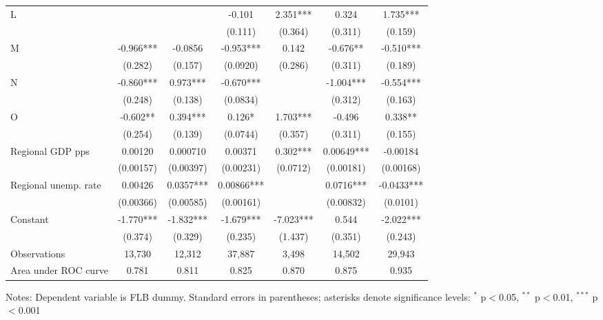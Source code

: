 \begin{threeparttable}
\begin{tabular}{l*{6}{S}}
\quad L                   &            &           & -0.101     & 2.351***  & 0.324      & 1.735***   \\
                          &            &           & (0.111)    & (0.364)   & (0.311)    & (0.159)    \\[0.5ex]

\quad M                   &  -0.966*** & -0.0856   & -0.953***  & 0.142     & -0.676**   & -0.510***  \\
                          &  (0.282)   & (0.157)   & (0.0920)   & (0.286)   & (0.311)    & (0.189)    \\[0.5ex]

\quad N                   &  -0.860*** & 0.973***  & -0.670***  &           & -1.004***  & -0.554***  \\
                          &  (0.248)   & (0.138)   & (0.0834)   &           & (0.312)    & (0.163)    \\[0.5ex]

\quad O                   &  -0.602**  & 0.394***  & 0.126*     & 1.703***  & -0.496     & 0.338**    \\
                          &  (0.254)   & (0.139)   & (0.0744)   & (0.357)   & (0.311)    & (0.155)    \\[0.5ex]

Regional GDP pps          &  0.00120   & 0.000710  & 0.00371    & 0.302***  & 0.00649*** & -0.00184   \\
                          &  (0.00157) & (0.00397) & (0.00231)  & (0.0712)  & (0.00181)  & (0.00168)  \\[0.5ex]

Regional unemp. rate      &  0.00426   & 0.0357*** & 0.00866*** &           & 0.0716***  & -0.0433*** \\
                          &  (0.00366) & (0.00585) & (0.00161)  &           & (0.00832)  & (0.0101)   \\[0.5ex]

Constant                  &  -1.770*** & -1.832*** & -1.679***  & -7.023*** & 0.544      & -2.022***  \\
                          &  (0.374)   & (0.329)   & (0.235)    & (1.437)   & (0.351)    & (0.243)    \\
\midrule
Observations              &  13,730    & 12,312    & 37,887     & 3,498     & 14,502     & 29,943     \\
Area under ROC curve      &  0.781     & 0.811     & 0.825      & 0.870     & 0.875      & 0.935      \\
\bottomrule
\end{tabular}
%
\begin{tablenotes}
\item Notes: Dependent variable is FLB dummy. Standard errors in parentheses; asterisks denote significance levels: $^{*}$ p$<$0.05, $^{**}$ p$<$0.01, $^{***}$ p$<$0.001
\end{tablenotes}

\end{threeparttable}
